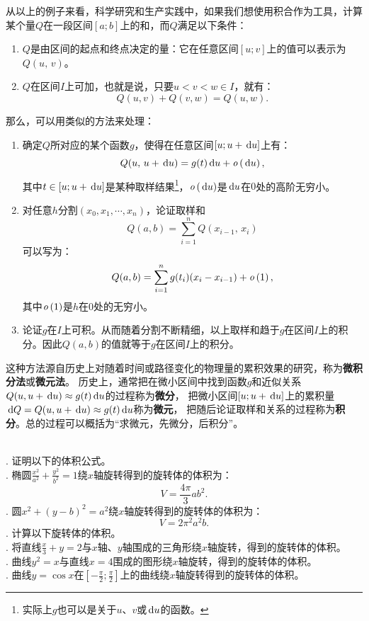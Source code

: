 \documentclass[12pt,UTF8]{ctexbook}
\begin{document}
从以上的例子来看，科学研究和生产实践中，如果我们想使用积合作为工具，计算某个量$Q$在一段区间$[a;b]$上的和，而$Q$满足以下条件：
\begin{enumerate}
    \item $Q$是由区间的起点和终点决定的量：它在任意区间$[u;v]$上的值可以表示为$Q(u,\, v)$。
    \item $Q$在区间$I$上可加，也就是说，只要$u < v < w \in I$，就有：
            $$ Q(u, v) + Q(v, w) = Q(u, w).$$
\end{enumerate}
那么，可以用类似的方法来处理：
\begin{enumerate}
    \item 确定$Q$所对应的某个函数$g$，使得在任意区间$[u;u + \,\mathrm{d}u]$上有：
    $$Q(u, \, u + \,\mathrm{d}u) = g(t)\,\mathrm{d}u + \mathit{o}\left(\,\mathrm{d}u\right),$$
    其中$t\in [u;u+ \,\mathrm{d}u]$是某种取样结果\footnote{实际上$g$也可以是关于$u$、$v$或$\,\mathrm{d}u$的函数。}，$\mathit{o}\left(\,\mathrm{d}u\right)$是$\,\mathrm{d}u$在$0$处的高阶无穷小。
    \item 对任意$h$\dash 分割$(x_0, x_1, \cdots, x_n)$，论证取样和
    $$Q(a, b) = \sum_{i=1}^n Q(x_{i-1},\, x_i)$$
    可以写为：
    $$Q(a, b) = \sum_{i=1}^n g(t_i)(x_i - x_{i-1}) + \mathit{o}\left(1\right),$$
    其中$\mathit{o}\left(1\right)$是$h$在$0$处的无穷小。
    \item 论证$g$在$I$上可积。从而随着分割不断精细，以上取样和趋于$g$在区间$I$上的积分。因此$Q(a, b)$的值就等于$g$在区间$I$上的积分。
\end{enumerate}
这种方法源自历史上对随着时间或路径变化的物理量的累积效果的研究，称为\textbf{微积分法}或\textbf{微元法}。
历史上，通常把在微小区间中找到函数$g$和近似关系$Q(u,u + \,\mathrm{d}u) \approx g(t)\,\mathrm{d}u$的过程称为\textbf{微分}，
把微小区间$[u;u+\,\mathrm{d}u]$上的累积量$\,\mathrm{d}Q = Q(u, u + \,\mathrm{d}u) \approx g(t)\,\mathrm{d}u$称为\textbf{微元}，
把随后论证取样和关系的过程称为\textbf{积分}。总的过程可以概括为“求微元，先微分，后积分”。


\begin{xt}
    \mbox{} \\
    . 证明以下的体积公式。\\
    . 椭圆$\displaystyle\frac{x^2}{a^2} + \frac{y^2}{b^2} = 1$绕$x$轴旋转得到的旋转体的体积为：
    $$ V = \frac{4\pi}{3} ab^2. $$
    . 圆$x^2 + (y - b)^2 = a^2$绕$x$轴旋转得到的旋转体的体积为：
    $$ V = 2\pi^2 a^2 b. $$
    . 计算以下旋转体的体积。\\
    . 将直线$\frac{x}{3} + y = 2$与$x$轴、$y$轴围成的三角形绕$x$轴旋转，得到的旋转体的体积。\\
    . 曲线$y^2 = x$与直线$x=4$围成的图形绕$x$轴旋转，得到的旋转体的体积。\\
    . 曲线$y = \cos{x}$在$\displaystyle\left[-\frac{\pi}{2};\frac{\pi}{2}\right]$上的曲线绕$x$轴旋转得到的旋转体的体积。
\end{xt}
\end{document}
